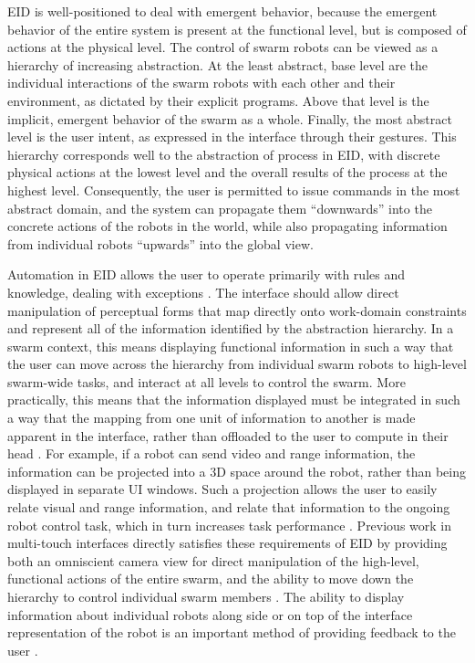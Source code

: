 EID is well-positioned to deal with emergent behavior, because the emergent behavior of the entire system is present at the functional level, but is composed of actions at the physical level.  
The control of swarm robots can be viewed as a hierarchy of increasing abstraction. 
At the least abstract, base level are the individual interactions of the swarm robots with each other and their environment, as dictated by their explicit programs. 
Above that level is the implicit, emergent behavior of the swarm as a whole. 
Finally, the most abstract level is the user intent, as expressed in the interface through their gestures. 
This hierarchy corresponds well to the abstraction of process in EID, with discrete physical actions at the lowest level and the overall results of the process at the highest level. 
Consequently, the user is permitted to issue commands in the most abstract domain, and the system can propagate them ``downwards'' into the concrete actions of the robots in the world, while also propagating information from individual robots ``upwards'' into the global view. 

Automation in EID allows the user to operate primarily with rules and knowledge, dealing with exceptions \citep{vicente2002ecological}.
The interface should allow direct manipulation of perceptual forms that map directly onto work-domain constraints and represent all of the information identified by the abstraction hierarchy. 
In a swarm context, this means displaying functional information in such a way that the user can move across the hierarchy from individual swarm robots to high-level swarm-wide tasks, and interact at all levels to control the swarm. 
More practically, this means that the information displayed must be integrated in such a way that the mapping from one unit of information to another is made apparent in the interface, rather than offloaded to the user to compute in their head \citep{yanco2004beyond}. 
For example, if a robot can send video and range information, the information can be projected into a 3D space around the robot, rather than being displayed in separate UI windows.
Such a projection allows the user to easily relate visual and range information, and relate that information to the ongoing robot control task, which in turn increases task performance \citep{ricks2004ecological}.
Previous work in multi-touch interfaces directly satisfies these requirements of EID by providing both an omniscient camera view for direct manipulation of the high-level, functional actions of the entire swarm, and the ability to move down the hierarchy to control individual swarm members \citep{Micire:2009:ANG:1731903.1731912}.
The ability to display information about individual robots along side or on top of the interface representation of the robot is an important method of providing feedback to the user \citep{Kato:2009:MIC:1520340.1520500}. 

